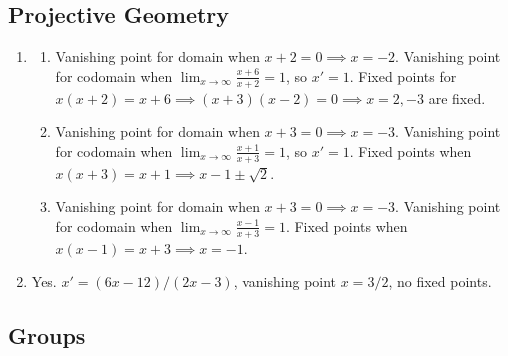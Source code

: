 \subsection{Projective Geometry}
\begin{enumerate}[font=\bfseries]
    \item[61]
          \begin{enumerate}[font=\bfseries]
              \item[a.] Vanishing point for domain when \(x + 2 = 0 \implies x = -2\). Vanishing point for codomain when \(\lim_{x \to \infty} \frac{x + 6}{x + 2} = 1\), so \(x' = 1\). Fixed points for \(x(x + 2) = x + 6 \implies (x + 3)(x - 2) = 0 \implies x = 2, -3\) are fixed.
              \item[b.] Vanishing point for domain when \(x + 3 = 0 \implies x = -3\). Vanishing point for codomain when \(\lim_{x \to \infty} \frac{x + 1}{x + 3} = 1\), so \(x' = 1\). Fixed points when \(x(x + 3) = x + 1 \implies x -1 \pm \sqrt{2}\).
              \item[c.] Vanishing point for domain when \(x + 3 = 0 \implies x = -3\). Vanishing point for codomain when \(\lim_{x \to \infty} \frac{x - 1}{x + 3} = 1\). Fixed points when \(x(x - 1) = x + 3 \implies x = -1\).
          \end{enumerate}
    \item[62] Yes. \(x ' = (6x - 12) / (2x - 3)\), vanishing point \(x = 3 / 2\), no fixed points.
\end{enumerate}

\subsection{Groups}

